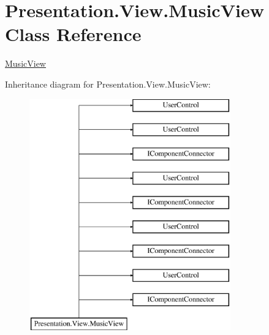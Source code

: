 \hypertarget{class_presentation_1_1_view_1_1_music_view}{}\section{Presentation.\+View.\+Music\+View Class Reference}
\label{class_presentation_1_1_view_1_1_music_view}


\hyperlink{class_presentation_1_1_view_1_1_music_view}{Music\+View}  


Inheritance diagram for Presentation.\+View.\+Music\+View\+:\begin{figure}[H]
\begin{center}
\leavevmode
\includegraphics[height=10.000000cm]{class_presentation_1_1_view_1_1_music_view}
\end{center}
\end{figure}
